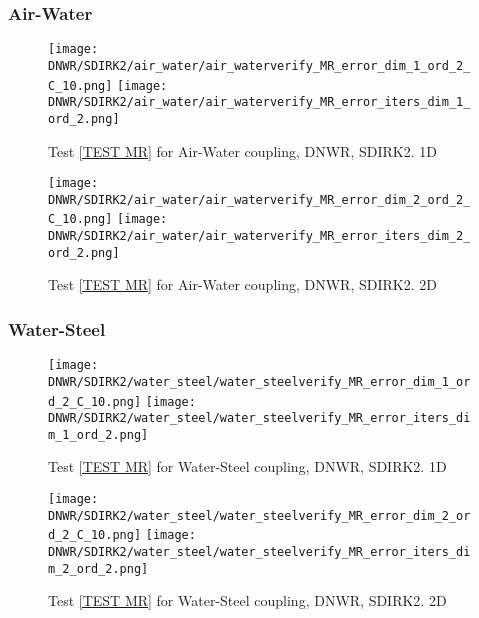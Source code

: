 \documentclass[a4paper,10pt]{article}
\begin{document}
\FloatBarrier
\subsubsection{Air-Water}\label{SEC DNWR SDIRK2 AIR WATER}
% 

\begin{figure}[!ht]
\texttt{[image: DNWR/SDIRK2/air\_water/air\_waterverify\_MR\_error\_dim\_1\_ord\_2\_C\_10.png]}
\texttt{[image: DNWR/SDIRK2/air\_water/air\_waterverify\_MR\_error\_iters\_dim\_1\_ord\_2.png]}
\caption{Test \ref{TEST MR} for Air-Water coupling, DNWR, SDIRK2. 1D}
\label{FIG DNWR SDIRK2 AIR WATER 1D}
\end{figure}

\begin{figure}[!ht]
\texttt{[image: DNWR/SDIRK2/air\_water/air\_waterverify\_MR\_error\_dim\_2\_ord\_2\_C\_10.png]}
\texttt{[image: DNWR/SDIRK2/air\_water/air\_waterverify\_MR\_error\_iters\_dim\_2\_ord\_2.png]}
\caption{Test \ref{TEST MR} for Air-Water coupling, DNWR, SDIRK2. 2D}
\label{FIG DNWR SDIRK2 AIR WATER 2D}
\end{figure}

\FloatBarrier
\subsubsection{Water-Steel}\label{SEC DNWR SDIRK2 WATER STEEL}
% 

\begin{figure}[!ht]
\texttt{[image: DNWR/SDIRK2/water\_steel/water\_steelverify\_MR\_error\_dim\_1\_ord\_2\_C\_10.png]}
\texttt{[image: DNWR/SDIRK2/water\_steel/water\_steelverify\_MR\_error\_iters\_dim\_1\_ord\_2.png]}
\caption{Test \ref{TEST MR} for Water-Steel coupling, DNWR, SDIRK2. 1D}
\label{FIG DNWR SDIRK2 WATER STEEL 1D}
\end{figure}

\begin{figure}[!ht]
\texttt{[image: DNWR/SDIRK2/water\_steel/water\_steelverify\_MR\_error\_dim\_2\_ord\_2\_C\_10.png]}
\texttt{[image: DNWR/SDIRK2/water\_steel/water\_steelverify\_MR\_error\_iters\_dim\_2\_ord\_2.png]}
\caption{Test \ref{TEST MR} for Water-Steel coupling, DNWR, SDIRK2. 2D}
\label{FIG DNWR SDIRK2 WATER STEEL 2D}
\end{figure}
\end{document}
